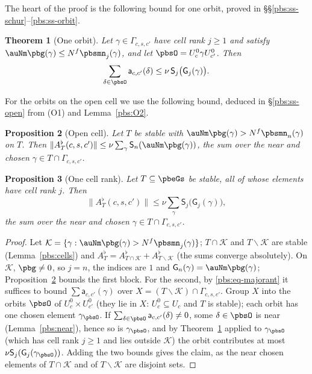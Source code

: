 \documentclass[10pt]{amsart}
\newtheorem{theorem}{Theorem}[section]
\newtheorem{proposition}[theorem]{Proposition}
\theoremstyle{definition}
\theoremstyle{remark}
\begin{document}
The heart of the proof is the following bound for one orbit, proved in
\S\S\ref{pbs:ss-schur}--\ref{pbs:ss-orbit}.

\begin{theorem}[One orbit]\label{pbs:orbit}
Let $\gamma\in\Gamma_{c,s,c'}$ have cell rank $j\ge1$ and satisfy $\auNm\pbg(\gamma)\le N^f
\pbsmn_j(\gamma)$, and let $\pbsO=U^0_c\gamma U^0_{c'}$. Then
\[
\sum_{\delta\in\pbsO}\mathsf a_{c,c'}(\delta)\le\nu\,\mathsf S_j\bigl(\mathsf G_j(\gamma)\bigr).
\]
\end{theorem}

For the orbits on the open cell we use the following bound, deduced in \S\ref{pbs:ss-open} from
(O1) and Lemma~\ref{pbs:O2}.

\begin{proposition}[Open cell]\label{pbs:open-block}
Let $T$ be stable with $\auNm\pbg(\gamma)>N^f\pbsmn_n(\gamma)$ on $T$. Then $\|A^\flat_T(c,s,c')\|\le
\nu\sum_\gamma\mathsf S_n(\auNm\pbg(\gamma))$, the sum over the near and chosen
$\gamma\in T\cap\Gamma_{c,s,c'}$.
\end{proposition}

\begin{proposition}[One cell rank]\label{pbs:rank}
Let $T\subseteq\pbeGs$ be stable, all of whose elements have cell rank $j$. Then
\[
\|A^\flat_T(c,s,c')\|\le\nu\sum_{\gamma}\mathsf S_j\bigl(\mathsf G_j(\gamma)\bigr),
\]
the sum over the near and chosen $\gamma\in T\cap\Gamma_{c,s,c'}$.
\end{proposition}
\begin{proof}
Let $\mathcal K=\{\gamma:\auNm\pbg(\gamma)>N^f\pbsmn_j(\gamma)\}$; $T\cap\mathcal K$ and $T\smallsetminus
\mathcal K$ are stable (Lemma~\ref{pbs:cells}) and $A^\flat_T=A^\flat_{T\cap\mathcal K}+A^\flat_{T
\smallsetminus\mathcal K}$ (the sums converge absolutely). On $\mathcal K$, $\pbg\ne0$, so $j=n$, the
indices are $1$ and $\mathsf G_n(\gamma)=\auNm\pbg(\gamma)$; Proposition~\ref{pbs:open-block} bounds
the first block. For the second, by \eqref{pbs:eq-majorant} it suffices to bound $\sum\mathsf a_{c,c'
}(\gamma)$ over $X=(T\smallsetminus\mathcal K)\cap\Gamma_{c,s,c'}$. Group $X$ into the orbits $\pbsO$
of $U^0_c\times U^0_{c'}$ (they lie in $X$: $U^0_c\subseteq U_c$ and $T$ is stable); each orbit has
one chosen element $\gamma_\pbsO$. If $\sum_{\delta\in\pbsO}\mathsf a_{c,c'}(\delta)\ne0$, some $\delta
\in\pbsO$ is near (Lemma~\ref{pbs:near}), hence so is $\gamma_\pbsO$, and by Theorem~\ref{pbs:orbit}
applied to $\gamma_\pbsO$ (which has cell rank $j\ge1$ and lies outside $\mathcal K$) the orbit
contributes at most $\nu\mathsf S_j(\mathsf G_j(\gamma_\pbsO))$. Adding the two bounds gives the
claim, as the near chosen elements of $T\cap\mathcal K$ and of $T\smallsetminus\mathcal K$ are
disjoint sets.
\end{proof}
\end{document}
